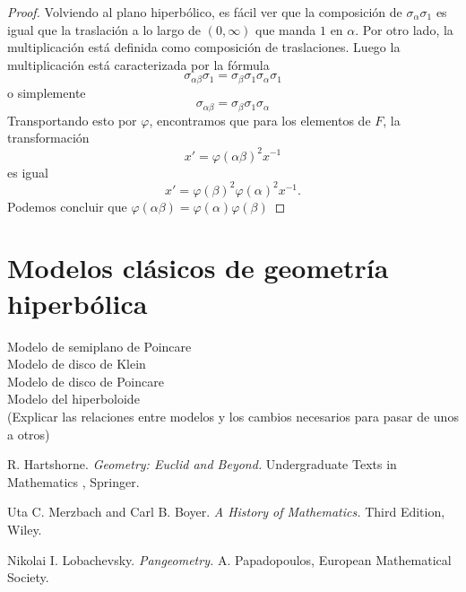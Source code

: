 \documentclass[a4paper]{amsart}
\theoremstyle{plain}
\begin{document}
\begin{proof}
Volviendo al plano hiperbólico, es fácil ver que la composición de $\sigma_\alpha\sigma_1$ es igual que la traslación a lo largo de $(0,\infty)$ que manda $1$ en $\alpha$. Por otro lado, la multiplicación está definida como composición de traslaciones. Luego la multiplicación está caracterizada por la fórmula
\[
\sigma_{\alpha\beta}\sigma_1=\sigma_{\beta}\sigma_1\sigma_\alpha\sigma_1
\]
o simplemente
\[
\sigma_{\alpha\beta}=\sigma_{\beta}\sigma_1\sigma_\alpha
\]
Transportando esto por $\varphi$, encontramos que para los elementos de $F$, la transformación
\[
x'=\varphi(\alpha\beta)^2x^{-1}
\]
es igual
\[
x'=\varphi(\beta)^2\varphi(\alpha)^2x^{-1}.
\]
Podemos concluir que $\varphi(\alpha\beta)=\varphi(\alpha)\varphi(\beta)$
\end{proof}


\newpage

\section{Modelos clásicos de geometría hiperbólica}
Modelo de semiplano de Poincare\\
Modelo de disco de Klein\\
Modelo de disco de Poincare\\
Modelo del hiperboloide\\
(Explicar las relaciones entre modelos y los cambios necesarios para pasar de unos a otros)



\tableofcontents

\begin{thebibliography}{}

 R. Hartshorne. \textit{Geometry: Euclid and Beyond.} Undergraduate Texts in Mathematics , Springer.

 Uta C. Merzbach and Carl B. Boyer. \textit{A History of Mathematics.} Third Edition, Wiley.

 Nikolai I. Lobachevsky. \textit{Pangeometry.} A. Papadopoulos, European Mathematical Society.

\end{thebibliography}
\end{document}
